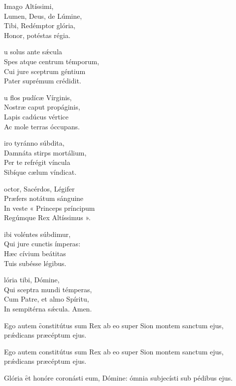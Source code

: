 \documentclass[fontsize=8pt,paper=A6,twoside,BCOR=1mm,DIV=22,headinclude]{scrarticle}
\begin{document}
\begin{multicols}{2}
\begin{hymnus}
	 Imago Altíssimi,\\
	\hspace{2.8em}Lumen, Deus, de Lúmine,\\
Tibi, Redémptor glória,\\
Honor, potéstas régia.

u solus ante sǽcula\\
Spes atque centrum témporum,\\
Cui jure sceptrum géntium\\
Pater suprémum crédidit.

u flos pudícæ Vírginis,\\
Nostræ caput propáginis,\\
Lapis cadúcus vértice\\
Ac mole terras óccupans.

iro tyránno súbdita,\\
Damnáta stirps mortálium,\\
Per te refrégit víncula\\
Sibíque cælum víndicat.

octor, Sacérdos, Légifer\\
Præfers notátum sánguine\\
In veste « Princeps príncipum\\
Regúmque Rex Altíssimus ».

ibi voléntes súbdimur,\\
Qui jure cunctis ímperas:\\
Hæc cívium beátitas\\
Tuis subésse légibus.

lória tibi, Dómine,\\
Qui sceptra mundi témperas,\\
Cum Patre, et almo Spíritu,\\
In sempitérna sǽcula.
Amen.
\end{hymnus}


\A Ego autem \f constitútus sum Rex ab eo super Sion montem sanctum ejus, prǽdicans præcéptum ejus.



{
\A Ego autem constitútus sum Rex ab eo super Sion montem sanctum ejus, prǽdicans præcéptum ejus.

\A Glória \f et honóre coronásti eum, Dómine: ómnia subjecísti sub pédibus ejus.

}
\end{multicols}
\end{document}
